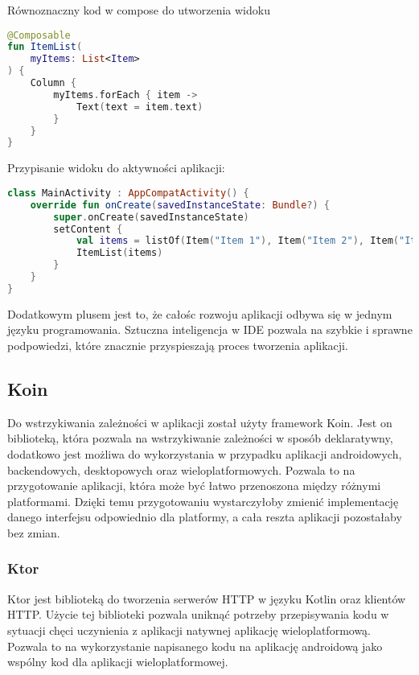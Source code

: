 Równoznaczny kod w compose do utworzenia widoku
\begin{lstlisting}[language=Kotlin]
@Composable
fun ItemList(
    myItems: List<Item>
) {
    Column {
        myItems.forEach { item ->
            Text(text = item.text)
        }
    }
}
\end{lstlisting}
Przypisanie widoku do aktywności aplikacji:
\begin{lstlisting}[language=Kotlin]
class MainActivity : AppCompatActivity() {
    override fun onCreate(savedInstanceState: Bundle?) {
        super.onCreate(savedInstanceState)
        setContent {
            val items = listOf(Item("Item 1"), Item("Item 2"), Item("Item 3"))
            ItemList(items)
        }
    }
}
\end{lstlisting}
Dodatkowym plusem jest to, że całośc rozwoju aplikacji odbywa się w jednym języku programowania.
Sztuczna inteligencja w IDE pozwala na szybkie i sprawne podpowiedzi, które znacznie przyspieszają proces tworzenia aplikacji.
\subsection{Koin}\label{app:used_technologies:koin}
Do wstrzykiwania zależności w aplikacji został użyty framework Koin.
Jest on biblioteką, która pozwala na wstrzykiwanie zależności w sposób deklaratywny, dodatkowo jest możliwa do wykorzystania w przypadku aplikacji androidowych, backendowych, desktopowych oraz wieloplatformowych.
Pozwala to na przygotowanie aplikacji, która może być łatwo przenoszona między różnymi platformami.
Dzięki temu przygotowaniu wystarczyłoby zmienić implementację danego interfejsu odpowiednio dla platformy, a cała reszta aplikacji pozostałaby bez zmian.
\cite{koinMultiplatform}

\subsubsection{Ktor}\label{app:used_technologies:ktor}
Ktor jest biblioteką do tworzenia serwerów HTTP w języku Kotlin oraz klientów HTTP.
Użycie tej biblioteki pozwala uniknąć potrzeby przepisywania kodu w sytuacji chęci uczynienia z aplikacji natywnej aplikację wieloplatformową.
Pozwala to na wykorzystanie napisanego kodu na aplikację androidową jako wspólny kod dla aplikacji wieloplatformowej.
\cite{ktorMultiplatform}
